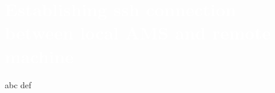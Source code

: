 \section{\textcolor{white}{Establishing ssh connection between local AMS and remote machine} \label{sec2}
}
abc def 

